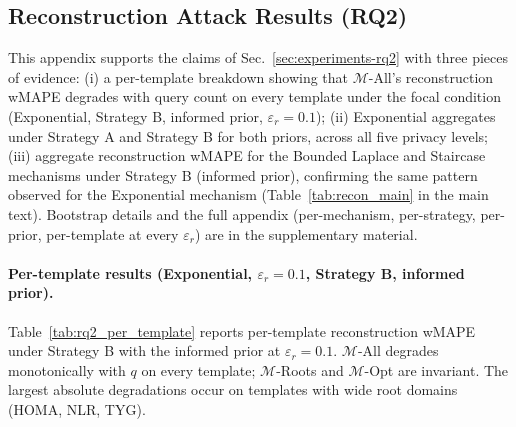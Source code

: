 


\subsection{Reconstruction Attack Results (RQ2)}
\label{app:rq2-tables}
\label{app:reconstruction}

This appendix supports the claims of Sec.~\ref{sec:experiments-rq2} with three pieces of evidence: (i) a per-template breakdown showing that $\mathcal{M}$-All's reconstruction wMAPE degrades with query count on every template under the focal condition (Exponential, Strategy B, informed prior, $\varepsilon_r = 0.1$); (ii) Exponential aggregates under Strategy A and Strategy B for both priors, across all five privacy levels; (iii) aggregate reconstruction wMAPE for the Bounded Laplace and Staircase mechanisms under Strategy B (informed prior), confirming the same pattern observed for the Exponential mechanism (Table~\ref{tab:recon_main} in the main text). Bootstrap details and the full appendix (per-mechanism, per-strategy, per-prior, per-template at every $\varepsilon_r$) are in the supplementary material.

\paragraph{Per-template results (Exponential, $\varepsilon_r = 0.1$, Strategy B, informed prior).}
Table~\ref{tab:rq2_per_template} reports per-template reconstruction wMAPE under Strategy B with the informed prior at $\varepsilon_r = 0.1$. $\mathcal{M}$-All degrades monotonically with $q$ on every template; $\mathcal{M}$-Roots and $\mathcal{M}$-Opt are invariant. The largest absolute degradations occur on templates with wide root domains (HOMA, NLR, TYG).


